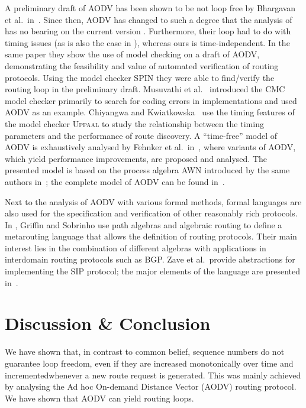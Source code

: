 \documentclass[letterpaper]{sig-alternate-pages}
\newcommand{\uppaal}{\textsc{Uppaal}}
\begin{document}
A preliminary draft of AODV has been shown to be not loop free by Bhargavan et al.\
in~\cite{BOG02}. Since then, AODV has changed to such a degree that
the analysis of \cite{BOG02} has no bearing on the current version \cite{rfc3561}.
Furthermore, their loop had to do with timing issues (as is also the case in \cite{Garcia04, Rangarajan05}), whereas ours is time-independent.
In the same paper they show the use  of model checking on a draft of AODV, demonstrating the feasibility and value of automated verification of routing protocols. Using the model checker SPIN they were able to find/verify the routing loop in the preliminary draft. Musuvathi et al.~\cite{MPCED02} introduced the CMC model checker primarily to search for coding errors in implementations and used AODV as an example. Chiyangwa and Kwiatkowska~\cite{CK05} use the timing features of the model checker {\uppaal} to study the relationship between the timing parameters and the performance of route discovery. 
A ``time-free'' model of AODV is exhaustively analysed by Fehnker et
al.\ in~\cite{TACAS12}, where variants of AODV, which
yield performance improvements, are  proposed and analysed. The presented model is based on
the process algebra AWN introduced by the same authors in~\cite{ESOP12}; the complete model of AODV can be found in~\cite{TR11}.

Next to the analysis of AODV with various formal methods, 
formal languages are also used for the specification and verification of other reasonably rich protocols.
In \cite{GS05}, Griffin and Sobrinho use path algebras and  algebraic routing to 
define a metarouting language that allows the definition of routing protocols. Their main interest lies in the combination 
of different algebras with applications in interdomain routing protocols such as BGP\@. Zave et al.\ provide abstractions for implementing the 
SIP protocol; the major elements of the language are presented in~\cite{ZaveEtAl09}.


\section{Discussion \& Conclusion}\label{sec:conclusion}
We have shown that, in contrast to common belief, sequence numbers do not 
guarantee loop freedom, even if they are increased monotonically over time and 
incremented\linebreak whenever a new route request is generated. This was mainly achieved by 
analysing the Ad hoc On-demand Distance Vector (AODV) routing protocol. 
We have shown that AODV can yield routing loops.
\end{document}
